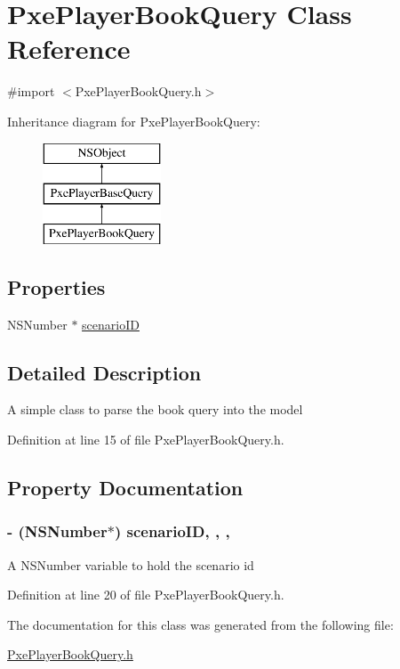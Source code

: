 \hypertarget{interface_pxe_player_book_query}{\section{Pxe\-Player\-Book\-Query Class Reference}
\label{interface_pxe_player_book_query}
}


{\ttfamily \#import $<$Pxe\-Player\-Book\-Query.\-h$>$}

Inheritance diagram for Pxe\-Player\-Book\-Query\-:\begin{figure}[H]
\begin{center}
\leavevmode
\includegraphics[height=3.000000cm]{interface_pxe_player_book_query}
\end{center}
\end{figure}
\subsection*{Properties}
\begin{DoxyCompactItemize}
\item 
N\-S\-Number $\ast$ \hyperlink{interface_pxe_player_book_query_a33a2649661a99e558c4c24fab797578b}{scenario\-I\-D}
\end{DoxyCompactItemize}


\subsection{Detailed Description}
A simple class to parse the book query into the model 

Definition at line 15 of file Pxe\-Player\-Book\-Query.\-h.



\subsection{Property Documentation}
\hypertarget{interface_pxe_player_book_query_a33a2649661a99e558c4c24fab797578b}{
\subsubsection[{scenario\-I\-D}]{\setlength{\rightskip}{0pt plus 5cm}-\/ (N\-S\-Number$\ast$) scenario\-I\-D\hspace{0.3cm}{\ttfamily [read]}, {\ttfamily [write]}, {\ttfamily [nonatomic]}, {\ttfamily [strong]}}}\label{interface_pxe_player_book_query_a33a2649661a99e558c4c24fab797578b}
A N\-S\-Number variable to hold the scenario id 

Definition at line 20 of file Pxe\-Player\-Book\-Query.\-h.



The documentation for this class was generated from the following file\-:\begin{DoxyCompactItemize}
\item 
\hyperlink{_pxe_player_book_query_8h}{Pxe\-Player\-Book\-Query.\-h}\end{DoxyCompactItemize}
